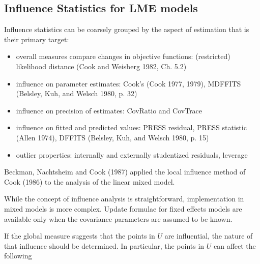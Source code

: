 \documentclass[12pt, a4paper]{article}
\begin{document}
	
	
	
	
	

	\subsection{Influence Statistics for LME models} %
	Influence statistics can be coarsely grouped by the aspect of estimation that is their primary target:
	\begin{itemize}
		\item overall measures compare changes in objective functions: (restricted) likelihood distance (Cook and Weisberg 1982, Ch. 5.2)
		\item influence on parameter estimates: Cook's  (Cook 1977, 1979), MDFFITS (Belsley, Kuh, and Welsch 1980, p. 32)
		\item influence on precision of estimates: CovRatio and CovTrace
		\item influence on fitted and predicted values: PRESS residual, PRESS statistic (Allen 1974), DFFITS (Belsley, Kuh, and Welsch 1980, p. 15)
		\item outlier properties: internally and externally studentized residuals, leverage
	\end{itemize}
	
	Beckman, Nachtsheim and Cook (1987) \citet{Beckman} applied the local influence method of Cook (1986) to the analysis of the linear mixed model.
	
	While the concept of influence analysis is straightforward, implementation in mixed models is more complex. Update formulae for fixed effects models are available only when the covariance parameters are assumed to be known.
	
	If the global measure suggests that the points in $U$ are influential, the nature of that influence should be determined. In particular, the points in $U$ can affect the following
	
\end{document}
